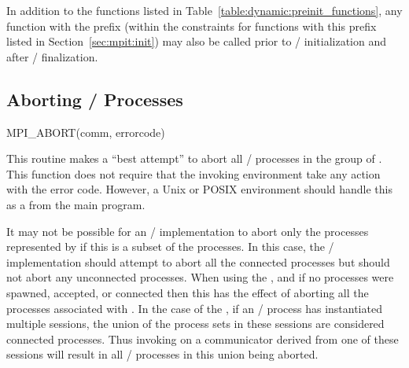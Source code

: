 In addition to the functions listed in Table~\ref{table:dynamic:preinit_functions}, any function with the prefix  (within the constraints for functions with this prefix listed in Section~\ref{sec:mpit:init}) may also be called prior to \MPI/ initialization and after \MPI/ finalization.

\subsection{Aborting \texorpdfstring{\mpi/}{MPI} Processes}

\begin{funcdef}{MPI\_ABORT}{(\mbox{comm}, \mbox{errorcode})}
\end{funcdef}

This routine makes a ``best attempt'' to abort all \MPI/ processes in the group
of .
This function does not require that the invoking environment take any action
with the error code.  However, a Unix or POSIX environment should handle this
as a  from the main program.


It may not be possible for an \MPI/ implementation to abort only the
processes represented by  if this is a subset of the processes.
In this case, the \MPI/ implementation should attempt to abort all the connected
processes but should not abort any unconnected processes.
When using the \wpm{}, and
if no processes were spawned, accepted, or connected then this has the effect
of aborting all the processes associated with .
In the case of the \spm{}, if an \MPI/ process
has instantiated multiple sessions, the union of the process sets in these
sessions are considered connected processes.  Thus invoking  on
a communicator derived from one of these sessions will result in all \MPI/ processes
in this union being aborted.

